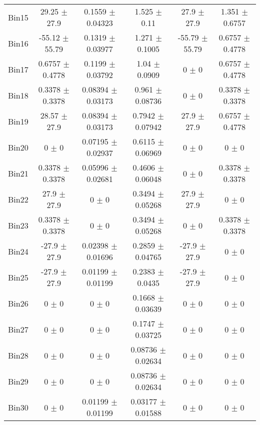\begin{tabular}{@{\extracolsep{4pt}}lccccc@{}}
     Bin15 & 29.25 $\pm$ 27.9 & 0.1559 $\pm$ 0.04323 & 1.525 $\pm$ 0.11 & 27.9 $\pm$ 27.9 & 1.351 $\pm$ 0.6757 \\ 
     Bin16 & -55.12 $\pm$ 55.79 & 0.1319 $\pm$ 0.03977 & 1.271 $\pm$ 0.1005 & -55.79 $\pm$ 55.79 & 0.6757 $\pm$ 0.4778 \\ 
     Bin17 & 0.6757 $\pm$ 0.4778 & 0.1199 $\pm$ 0.03792 & 1.04 $\pm$ 0.0909 & 0 $\pm$ 0 & 0.6757 $\pm$ 0.4778 \\ 
     Bin18 & 0.3378 $\pm$ 0.3378 & 0.08394 $\pm$ 0.03173 & 0.961 $\pm$ 0.08736 & 0 $\pm$ 0 & 0.3378 $\pm$ 0.3378 \\ 
     Bin19 & 28.57 $\pm$ 27.9 & 0.08394 $\pm$ 0.03173 & 0.7942 $\pm$ 0.07942 & 27.9 $\pm$ 27.9 & 0.6757 $\pm$ 0.4778 \\ 
     Bin20 & 0 $\pm$ 0 & 0.07195 $\pm$ 0.02937 & 0.6115 $\pm$ 0.06969 & 0 $\pm$ 0 & 0 $\pm$ 0 \\ 
     Bin21 & 0.3378 $\pm$ 0.3378 & 0.05996 $\pm$ 0.02681 & 0.4606 $\pm$ 0.06048 & 0 $\pm$ 0 & 0.3378 $\pm$ 0.3378 \\ 
     Bin22 & 27.9 $\pm$ 27.9 & 0 $\pm$ 0 & 0.3494 $\pm$ 0.05268 & 27.9 $\pm$ 27.9 & 0 $\pm$ 0 \\ 
     Bin23 & 0.3378 $\pm$ 0.3378 & 0 $\pm$ 0 & 0.3494 $\pm$ 0.05268 & 0 $\pm$ 0 & 0.3378 $\pm$ 0.3378 \\ 
     Bin24 & -27.9 $\pm$ 27.9 & 0.02398 $\pm$ 0.01696 & 0.2859 $\pm$ 0.04765 & -27.9 $\pm$ 27.9 & 0 $\pm$ 0 \\ 
     Bin25 & -27.9 $\pm$ 27.9 & 0.01199 $\pm$ 0.01199 & 0.2383 $\pm$ 0.0435 & -27.9 $\pm$ 27.9 & 0 $\pm$ 0 \\ 
     Bin26 & 0 $\pm$ 0 & 0 $\pm$ 0 & 0.1668 $\pm$ 0.03639 & 0 $\pm$ 0 & 0 $\pm$ 0 \\ 
     Bin27 & 0 $\pm$ 0 & 0 $\pm$ 0 & 0.1747 $\pm$ 0.03725 & 0 $\pm$ 0 & 0 $\pm$ 0 \\ 
     Bin28 & 0 $\pm$ 0 & 0 $\pm$ 0 & 0.08736 $\pm$ 0.02634 & 0 $\pm$ 0 & 0 $\pm$ 0 \\ 
     Bin29 & 0 $\pm$ 0 & 0 $\pm$ 0 & 0.08736 $\pm$ 0.02634 & 0 $\pm$ 0 & 0 $\pm$ 0 \\ 
     Bin30 & 0 $\pm$ 0 & 0.01199 $\pm$ 0.01199 & 0.03177 $\pm$ 0.01588 & 0 $\pm$ 0 & 0 $\pm$ 0 \\ 
\hline\hline
  \end{tabular}
